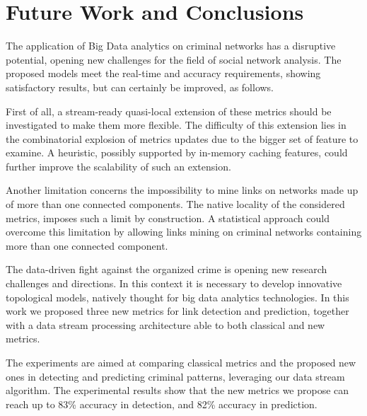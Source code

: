 \section{Future Work and Conclusions}
\label{sec:further-improvements}

The application of Big Data analytics on criminal networks has a disruptive potential, opening new challenges for the field of social network analysis.
%
The proposed models meet the real-time and accuracy requirements, showing satisfactory results, but can certainly be improved, as follows.

First of all, a stream-ready quasi-local extension of these metrics should be investigated to make them more flexible. 
%
The difficulty of this extension lies in the combinatorial explosion of metrics updates due to the bigger set of feature to examine.
%
A heuristic, possibly supported by in-memory caching features, could further improve the scalability of such an extension.

Another limitation concerns the impossibility to mine links on networks made up of more than one connected components. The native locality of the considered metrics, imposes such a limit by construction.
%
A statistical approach could overcome this limitation by allowing links mining on criminal networks containing more than one connected component. 

%
%
%
The data-driven fight against the organized crime is opening new research challenges and directions. 
In this context it is necessary to develop innovative topological models, natively thought for big data analytics technologies.
In this work we proposed three new metrics for link detection and prediction, together with a data stream processing architecture able to both classical and new metrics.

The experiments are aimed at comparing classical metrics and the proposed new ones in detecting and predicting criminal patterns, leveraging our data stream algorithm. The experimental results show that the new metrics we propose can reach up to 83\% accuracy in detection, and 82\% accuracy in prediction.
